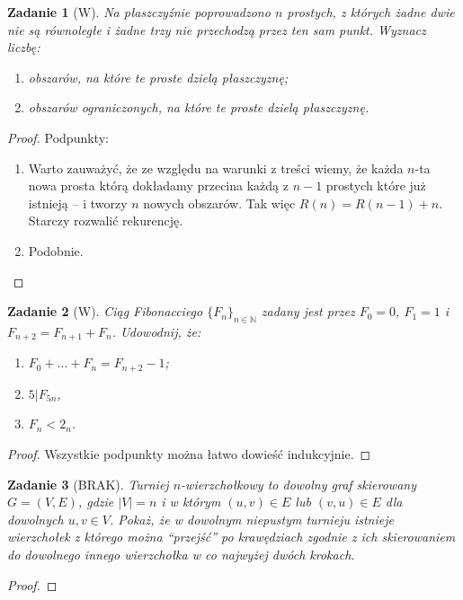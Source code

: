 \documentclass{mwbk}
\newtheorem{zad}{Zadanie}[chapter]
\begin{document}
\begin{zad}[W]
    Na płaszczyźnie poprowadzono $n$ prostych, z których żadne dwie nie
    są równoległe i żadne trzy nie przechodzą przez ten sam punkt.
    Wyznacz liczbę:
    \begin{enumerate}
        \item obszarów, na które te proste dzielą płaszczyznę;
        \item obszarów ograniczonych, na które te proste dzielą płaszczyznę.
    \end{enumerate}
\end{zad}
\begin{proof}
    Podpunkty:
    \begin{enumerate}
        \item Warto zauważyć, że ze względu na warunki z treści
              wiemy, że każda $n$-ta nowa prosta którą dokładamy przecina każdą z $n-1$
              prostych które już istnieją -- i tworzy $n$ nowych obszarów. Tak więc
              $R(n)= R(n-1) + n$. Starczy rozwalić rekurencję.
        \item Podobnie.
    \end{enumerate}
\end{proof}

\begin{zad}[W]
    Ciąg Fibonacciego $\{F_n\}_{n \in \mathbb{N}}$ zadany jest przez
    $F_0=0$, $F_1=1$ i $F_{n+2}=F_{n+1}+F_n$. Udowodnij, że: \\
    \begin{enumerate}
        \item $F_0 + ... + F_n = F_{n+2} - 1$;
        \item $5|F_{5n}$,
        \item $F_n < 2_n$.
    \end{enumerate}
\end{zad}
\begin{proof}
    Wszystkie podpunkty można łatwo dowieść indukcyjnie.
\end{proof}

\begin{zad}[BRAK]
    Turniej $n$-wierzchołkowy to dowolny graf skierowany $G = (V, E)$, gdzie $|V| = n$
    i w którym $(u, v) \in E$ lub $(v, u) \in E$ dla dowolnych $u, v \in V$.
    Pokaż, że w dowolnym niepustym turnieju istnieje wierzchołek z którego można “przejść”
    po krawędziach zgodnie z ich skierowaniem do dowolnego innego wierzchołka w co
    najwyżej dwóch krokach.
\end{zad}
\begin{proof}
\end{proof}
\end{document}
